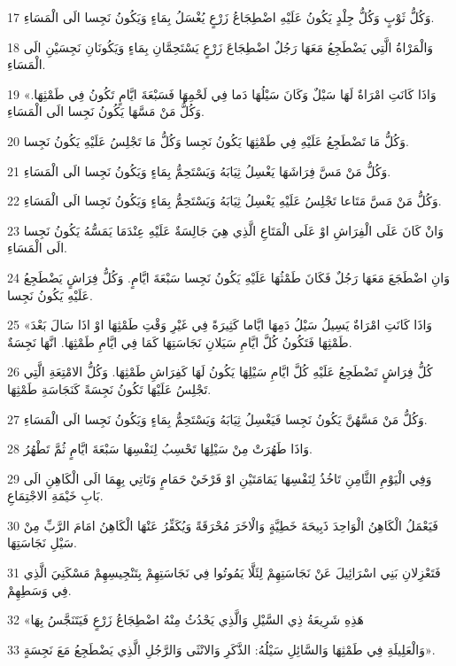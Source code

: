 \par 17 وَكُلُّ ثَوْبٍ وَكُلُّ جِلْدٍ يَكُونُ عَلَيْهِ اضْطِجَاعُ زَرْعٍ يُغْسَلُ بِمَاءٍ وَيَكُونُ نَجِسا الَى الْمَسَاءِ.
\par 18 وَالْمَرْاةُ الَّتِي يَضْطَجِعُ مَعَهَا رَجُلٌ اضْطِجَاعَ زَرْعٍ يَسْتَحِمَّانِ بِمَاءٍ وَيَكُونَانِ نَجِسَيْنِ الَى الْمَسَاءِ.
\par 19 «وَاذَا كَانَتِ امْرَاةٌ لَهَا سَيْلٌ وَكَانَ سَيْلُهَا دَما فِي لَحْمِهَا فَسَبْعَةَ ايَّامٍ تَكُونُ فِي طَمْثِهَا. وَكُلُّ مَنْ مَسَّهَا يَكُونُ نَجِسا الَى الْمَسَاءِ.
\par 20 وَكُلُّ مَا تَضْطَجِعُ عَلَيْهِ فِي طَمْثِهَا يَكُونُ نَجِسا وَكُلُّ مَا تَجْلِسُ عَلَيْهِ يَكُونُ نَجِسا.
\par 21 وَكُلُّ مَنْ مَسَّ فِرَاشَهَا يَغْسِلُ ثِيَابَهُ وَيَسْتَحِمُّ بِمَاءٍ وَيَكُونُ نَجِسا الَى الْمَسَاءِ.
\par 22 وَكُلُّ مَنْ مَسَّ مَتَاعا تَجْلِسُ عَلَيْهِ يَغْسِلُ ثِيَابَهُ وَيَسْتَحِمُّ بِمَاءٍ وَيَكُونُ نَجِسا الَى الْمَسَاءِ.
\par 23 وَانْ كَانَ عَلَى الْفِرَاشِ اوْ عَلَى الْمَتَاعِ الَّذِي هِيَ جَالِسَةٌ عَلَيْهِ عِنْدَمَا يَمَسُّهُ يَكُونُ نَجِسا الَى الْمَسَاءِ.
\par 24 وَانِ اضْطَجَعَ مَعَهَا رَجُلٌ فَكَانَ طَمْثُهَا عَلَيْهِ يَكُونُ نَجِسا سَبْعَةَ ايَّامٍ. وَكُلُّ فِرَاشٍ يَضْطَجِعُ عَلَيْهِ يَكُونُ نَجِسا.
\par 25 «وَاذَا كَانَتِ امْرَاةٌ يَسِيلُ سَيْلُ دَمِهَا ايَّاما كَثِيرَةً فِي غَيْرِ وَقْتِ طَمْثِهَا اوْ اذَا سَالَ بَعْدَ طَمْثِهَا فَتَكُونُ كُلَّ ايَّامِ سَيَلانِ نَجَاسَتِهَا كَمَا فِي ايَّامِ طَمْثِهَا. انَّهَا نَجِسَةٌ.
\par 26 كُلُّ فِرَاشٍ تَضْطَجِعُ عَلَيْهِ كُلَّ ايَّامِ سَيْلِهَا يَكُونُ لَهَا كَفِرَاشِ طَمْثِهَا. وَكُلُّ الامْتِعَةِ الَّتِي تَجْلِسُ عَلَيْهَا تَكُونُ نَجِسَةً كَنَجَاسَةِ طَمْثِهَا.
\par 27 وَكُلُّ مَنْ مَسَّهُنَّ يَكُونُ نَجِسا فَيَغْسِلُ ثِيَابَهُ وَيَسْتَحِمُّ بِمَاءٍ وَيَكُونُ نَجِسا الَى الْمَسَاءِ.
\par 28 وَاذَا طَهُرَتْ مِنْ سَيْلِهَا تَحْسِبُ لِنَفْسِهَا سَبْعَةَ ايَّامٍ ثُمَّ تَطْهُرُ.
\par 29 وَفِي الْيَوْمِ الثَّامِنِ تَاخُذُ لِنَفْسِهَا يَمَامَتَيْنِ اوْ فَرْخَيْ حَمَامٍ وَتَاتِي بِهِمَا الَى الْكَاهِنِ الَى بَابِ خَيْمَةِ الاجْتِمَاعِ.
\par 30 فَيَعْمَلُ الْكَاهِنُ الْوَاحِدَ ذَبِيحَةَ خَطِيَّةٍ وَالْاخَرَ مُحْرَقَةً وَيُكَفِّرُ عَنْهَا الْكَاهِنُ امَامَ الرَّبِّ مِنْ سَيْلِ نَجَاسَتِهَا.
\par 31 فَتَعْزِلانِ بَنِي اسْرَائِيلَ عَنْ نَجَاسَتِهِمْ لِئَلَّا يَمُوتُوا فِي نَجَاسَتِهِمْ بِتَنْجِيسِهِمْ مَسْكَنِيَ الَّذِي فِي وَسَطِهِمْ.
\par 32 «هَذِهِ شَرِيعَةُ ذِي السَّيْلِ وَالَّذِي يَحْدُثُ مِنْهُ اضْطِجَاعُ زَرْعٍ فَيَتَنَجَّسُ بِهَا
\par 33 وَالْعَلِيلَةِ فِي طَمْثِهَا وَالسَّائِلِ سَيْلُهُ: الذَّكَرِ وَالانْثَى وَالرَّجُلِ الَّذِي يَضْطَجِعُ مَعَ نَجِسَةٍ».

